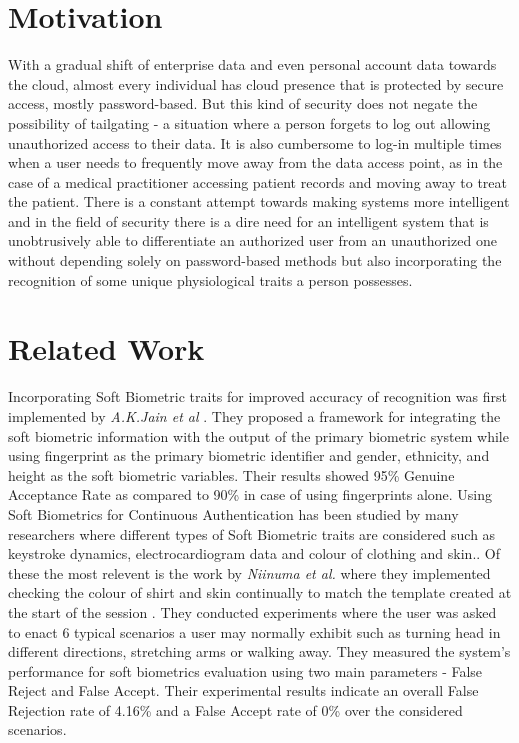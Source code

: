 \documentclass[%
        final,
        notitlepage,
        narroweqnarray,
        inline,
        ]{ieee}
\begin{document}
\section{Motivation}
With a gradual shift of enterprise data and even personal account data towards the cloud, almost every individual has cloud presence that is protected by secure access, mostly password-based. But this kind of security does not negate the possibility of tailgating - a situation where a person forgets to log out allowing unauthorized access to their data. It is also cumbersome to log-in multiple times when a user needs to frequently move away from the data access point, as in the case of a medical practitioner accessing patient records and moving away to treat the patient. There is a constant attempt towards making systems more intelligent and in the field of security there is a dire need for an intelligent system that is unobtrusively able to differentiate an authorized user from an unauthorized one without depending solely on password-based methods but also incorporating the recognition of some unique physiological traits a person possesses.

\section{Related Work}
Incorporating Soft Biometric traits for improved accuracy of recognition was first implemented by \emph{A.K.Jain et al} \cite{Jain204}. They proposed a framework for integrating the soft biometric information with the output of the primary biometric system while using fingerprint as the primary biometric identifier and gender, ethnicity, and height as the soft biometric variables. Their results showed 95\% Genuine Acceptance Rate as compared to 90\% in case of using fingerprints alone. 
Using Soft Biometrics for Continuous Authentication has been studied by many researchers where different types of Soft Biometric traits are considered such as keystroke dynamics, electrocardiogram data and colour of clothing and skin.\cite{mon00,ecd,Niin10}. Of these the most relevent is the work by \emph{Niinuma et al.} where they implemented checking the colour of shirt and skin continually to match the template created at the start of the session \cite{Niin10}. They conducted experiments where the user was asked to enact 6 typical scenarios a user may normally exhibit such as turning head in different directions, stretching arms or walking away. They measured the system's performance for soft biometrics evaluation using two main parameters - False Reject and False Accept. Their experimental results indicate an overall False Rejection rate of 4.16\% and a False Accept rate of 0\% over the considered scenarios.
\end{document}
